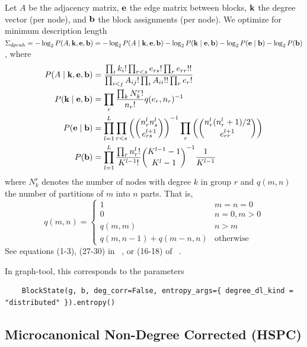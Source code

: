 \documentclass[aps,pre,superscriptaddress]{article}
\begin{document}
Let $A$ be the adjacency matrix, $\vb{e}$ the edge matrix between blocks, $\vb{k}$ the degree vector (per node), and $\vb{b}$ the block assignments (per node).
We optimize for minimum description length $\Sigma_{dpcuh} = -\log_2P(A, \vb{k}, \vb{e}, \vb{b}) = -\log_2P(A \mid \vb{k}, \vb{e}, \vb{b}) - \log_2 P(\vb{k} \mid \vb{e}, \vb{b}) - \log_2 P(\vb{e} \mid \vb{b}) - \log_2 P(\vb{b}) $, where
\begin{align}
	P(A \mid \vb{k}, \vb{e}, \vb{b}) & = \frac{ \prod_i k_i! \prod_{r < s} e_{rs}! \prod_{r} e_{rr}!!} {\prod_{i < j} A_{ij}! \prod_i A_{ii}!! \prod_r e_r!}                                      \\
	P(\vb{k} \mid \vb{e}, \vb{b})    & = \prod_r \frac{\prod_k N_k^r!}{n_r!} q(e_r, n_r)^{-1}                                                                                                     \\
	P(\vb{e} \mid \vb{b})            & = \prod_{l=1}^{L} \prod_{r < s} \left( \binom{n_r^l n_s^l}{e_{rs}^{l+1}} \right)^{-1} \prod_r \left( \binom{ n_r^l (n_r^l + 1) / 2 }{e_{rr}^{l+1} }\right) \\
	P(\vb{b})                        & = \prod_{l=1}^L \frac{\prod_r n_r^l!}{K^{l-1}!} \binom{ K^{l-1} - 1}{K^l - 1}^{-1} \frac{1}{K^{l-1}}
\end{align}
where $N_k^r$ denotes the number of nodes with degree $k$ in group $r$ and $q(m, n)$ the number of partitions of $m$ into $n$ parts.
That is,
\begin{equation}
	q(m, n) =
	\begin{cases}
		1                         & m = n = 0        \\
		0                         & n = 0, m > 0     \\
		q(m, m)                   & n > m            \\
		q(m, n - 1) + q(m - n, n) & \text{otherwise}
	\end{cases}
\end{equation}
See equations (1-3), (27-30) in ~\cite{peixoto17-01}, or (16-18) of ~\cite{funke19-04}.

In graph-tool, this corresponds to the parameters
\begin{verbatim}
    BlockState(g, b, deg_corr=False, entropy_args={ degree_dl_kind = "distributed" }).entropy()
\end{verbatim}

\subsection{Microcanonical Non-Degree Corrected (HSPC)}
\end{document}
